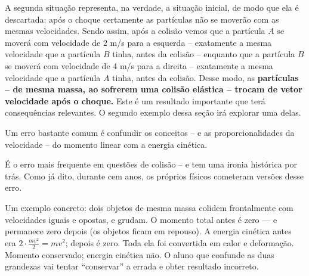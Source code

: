 A segunda situação representa, na verdade, a situação inicial, de modo que ela é descartada: após o choque certamente as partículas não se moverão com as mesmas velocidades. Sendo assim, após a colisão vemos que a partícula $A$ se moverá com velocidade de 2 m/s para a esquerda -- exatamente a mesma velocidade que a partícula $B$ tinha, antes da colisão -- enquanto que a partícula $B$ se moverá com velocidade de 4 m/s para a direita -- exatamente a mesma velocidade que a partícula $A$ tinha, antes da colisão. Desse modo, as \textbf{partículas -- de mesma massa, ao sofrerem uma colisão elástica -- trocam de vetor velocidade após o choque.} Este é um resultado importante que terá consequências relevantes. O segundo exemplo dessa seção irá explorar uma delas.








Um erro bastante comum é confundir os conceitos -- e as proporcionalidades da velocidade -- do momento linear com a energia cinética.

É o erro mais frequente em questões de colisão -- e tem uma ironia histórica por trás. Como já dito, durante cem anos, os próprios físicos cometeram versões desse erro.
 
 
Um exemplo concreto: dois objetos de mesma massa colidem frontalmente com velocidades
iguais e opostas, e grudam. O momento total antes é zero — e permanece zero depois
(os objetos ficam em repouso). A energia cinética antes era
$2 \cdot \frac{mv^2}{2} = mv^2$; depois é zero. Toda ela foi convertida em calor e deformação. Momento conservado; energia cinética não. O aluno que confunde as duas grandezas vai tentar ``conservar'' a errada e obter resultado incorreto.
 
